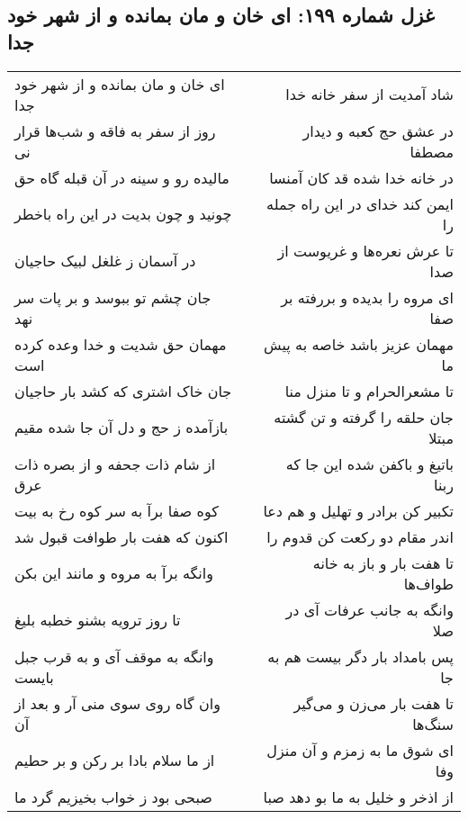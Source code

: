 \begin{center}
\section*{غزل شماره ۱۹۹: ای خان و مان بمانده و از شهر خود جدا}
\label{sec:0199}
\begin{longtable}{l p{0.5cm} r}
ای خان و مان بمانده و از شهر خود جدا
&&
شاد آمدیت از سفر خانه خدا
\\
روز از سفر به فاقه و شب‌ها قرار نی
&&
در عشق حج کعبه و دیدار مصطفا
\\
مالیده رو و سینه در آن قبله گاه حق
&&
در خانه خدا شده قد کان آمنسا
\\
چونید و چون بدیت در این راه باخطر
&&
ایمن کند خدای در این راه جمله را
\\
در آسمان ز غلغل لبیک حاجیان
&&
تا عرش نعره‌ها و غریوست از صدا
\\
جان چشم تو ببوسد و بر پات سر نهد
&&
ای مروه را بدیده و بررفته بر صفا
\\
مهمان حق شدیت و خدا وعده کرده است
&&
مهمان عزیز باشد خاصه به پیش ما
\\
جان خاک اشتری که کشد بار حاجیان
&&
تا مشعرالحرام و تا منزل منا
\\
بازآمده ز حج و دل آن جا شده مقیم
&&
جان حلقه را گرفته و تن گشته مبتلا
\\
از شام ذات جحفه و از بصره ذات عرق
&&
باتیغ و باکفن شده این جا که ربنا
\\
کوه صفا برآ به سر کوه رخ به بیت
&&
تکبیر کن برادر و تهلیل و هم دعا
\\
اکنون که هفت بار طوافت قبول شد
&&
اندر مقام دو رکعت کن قدوم را
\\
وانگه برآ به مروه و مانند این بکن
&&
تا هفت بار و باز به خانه طواف‌ها
\\
تا روز ترویه بشنو خطبه بلیغ
&&
وانگه به جانب عرفات آی در صلا
\\
وانگه به موقف آی و به قرب جبل بایست
&&
پس بامداد بار دگر بیست هم به جا
\\
وان گاه روی سوی منی آر و بعد از آن
&&
تا هفت بار می‌زن و می‌گیر سنگ‌ها
\\
از ما سلام بادا بر رکن و بر حطیم
&&
ای شوق ما به زمزم و آن منزل وفا
\\
صبحی بود ز خواب بخیزیم گرد ما
&&
از اذخر و خلیل به ما بو دهد صبا
\\
\end{longtable}
\end{center}
